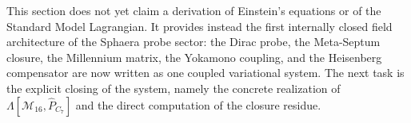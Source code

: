 \begin{remark}
This section does not yet claim a derivation of Einstein's equations or
of the Standard Model Lagrangian.
It provides instead the first internally closed field architecture of
the Sphaera probe sector: the Dirac probe, the Meta-Septum closure, the
Millennium matrix, the Yokamono coupling, and the Heisenberg
compensator are now written as one coupled variational system.
The next task is the explicit closing of the system, namely the concrete
realization of $\Lambda[\mathcal M_{16},\hat P_{C_7}]$ and the direct
computation of the closure residue.

\end{remark}


